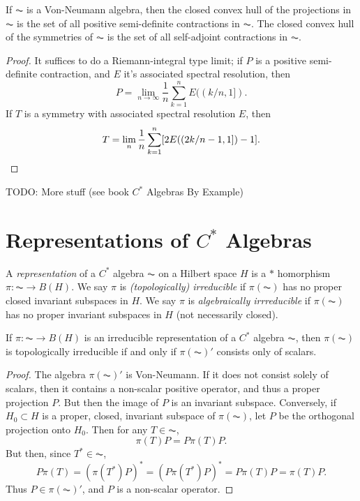 \begin{theorem}
    If $\AC$ is a Von-Neumann algebra, then the closed convex hull of the projections in $\AC$ is the set of all positive semi-definite contractions in $\AC$. The closed convex hull of the symmetries of $\AC$ is the set of all self-adjoint contractions in $\AC$.
\end{theorem}
\begin{proof}
    It suffices to do a Riemann-integral type limit; if $P$ is a positive semi-definite contraction, and $E$ it's associated spectral resolution, then
    \[ P = \lim_{n \to \infty} \frac{1}{n} \sum_{k = 1}^n E((k/n,1]). \]
    If $T$ is a symmetry with associated spectral resolution $E$, then
    \[ T = \lim_n \frac{1}{n} \sum_{k = 1}^n [2 E((2k/n - 1, 1]) - 1]. \qedhere \]
\end{proof}

TODO: More stuff (see book $C^*$ Algebras By Example)







\section{Representations of $C^*$ Algebras}

A \emph{representation} of a $C^*$ algebra $\AC$ on a Hilbert space $H$ is a $*$ homorphism $\pi: \AC \to B(H)$. We say $\pi$ is \emph{(topologically) irreducible} if $\pi(\AC)$ has no proper closed invariant subspaces in $H$. We say $\pi$ is \emph{algebraically irrreducible} if $\pi(\AC)$ has no proper invariant subspaces in $H$ (not necessarily closed).

\begin{theorem}
    If $\pi: \AC \to B(H)$ is an irreducible representation of a $C^*$ algebra $\AC$, then $\pi(\AC)$ is topologically irreducible if and only if $\pi(\AC)'$ consists only of scalars.
\end{theorem}
\begin{proof}
    The algebra $\pi(\AC)'$ is Von-Neumann. If it does not consist solely of scalars, then it contains a non-scalar positive operator, and thus a proper projection $P$. But then the image of $P$ is an invariant subspace. Conversely, if $H_0 \subset H$ is a proper, closed, invariant subspace of $\pi(\AC)$, let $P$ be the orthogonal projection onto $H_0$. Then for any $T \in \AC$,
    \[ \pi(T) P = P \pi(T) P. \]
    But then, since $T^* \in \AC$,
    \[ P \pi(T) = (\pi(T^*) P)^* = (P \pi(T^*) P)^* = P \pi(T) P = \pi(T) P. \]
    Thus $P \in \pi(\AC)'$, and $P$ is a non-scalar operator.
\end{proof}

